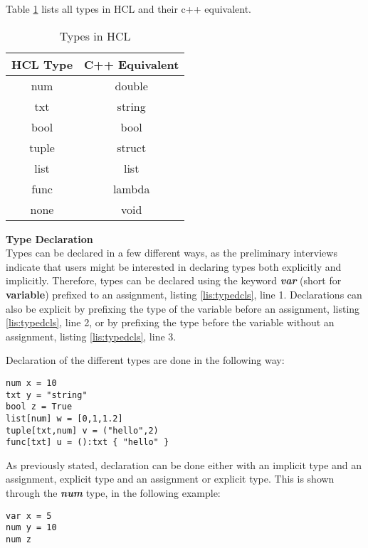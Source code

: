 Table \ref{tbl:types} lists all types in HCL and their c++ equivalent.
\begin{table}[H]
	\centering
	\caption{Types in HCL}
	\label{tbl:types}
	\begin{tabular}{|c|c|}
		\hline
		HCL Type & C++ Equivalent \\ \hline
		num      & double         \\ \hline
		txt      & string         \\ \hline
		bool     & bool           \\ \hline
		tuple    & struct         \\ \hline
		list     & list           \\ \hline
		func     & lambda         \\ \hline
		none     & void           \\ \hline
	\end{tabular}
\end{table}
\textbf{Type Declaration}\\
Types can be declared in a few different ways, as the preliminary interviews indicate that users might be interested in declaring types both explicitly and implicitly.
Therefore, types can be declared using the keyword \textbf{\textit{var}} (short for \textbf{variable\textit{}}) prefixed to an assignment, listing \ref{lis:typedcls}, line 1.
Declarations can also be explicit by prefixing the type of the variable before an assignment, listing \ref{lis:typedcls}, line 2, or by prefixing the type before the variable without an assignment, listing \ref{lis:typedcls}, line 3.

Declaration of the different types are done in the following way:
\begin{lstlisting}[language=HCL,label=lis:typedcls,firstnumber=1]
num x = 10
txt y = "string"
bool z = True
list[num] w = [0,1,1.2]
tuple[txt,num] v = ("hello",2)
func[txt] u = ():txt { "hello" }
\end{lstlisting}

As previously stated, declaration can be done either with an implicit type and an assignment, explicit type and an assignment or explicit type.
This is shown through the \textbf{\textit{num}} type, in the following example:

\begin{lstlisting}[language=HCL,label=lis:typedcls,firstnumber=1]
var x = 5
num y = 10
num z

\end{lstlisting}

